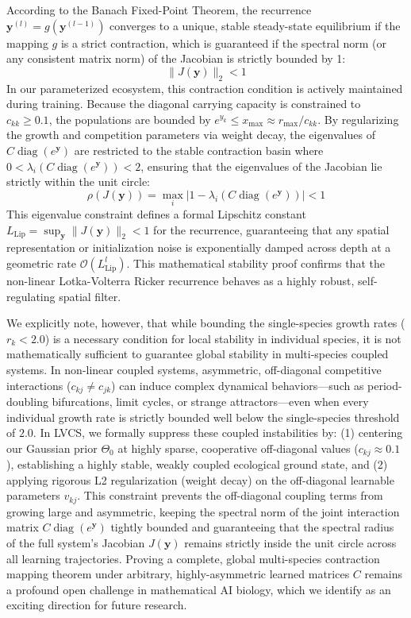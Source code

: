 According to the Banach Fixed-Point Theorem, the recurrence $\mathbf{y}^{(l)} = g(\mathbf{y}^{(l-1)})$ converges to a unique, stable steady-state equilibrium if the mapping $g$ is a strict contraction, which is guaranteed if the spectral norm (or any consistent matrix norm) of the Jacobian is strictly bounded by 1:
\begin{equation}
    \|J(\mathbf{y})\|_2 < 1
\end{equation}
In our parameterized ecosystem, this contraction condition is actively maintained during training. Because the diagonal carrying capacity is constrained to $c_{kk} \ge 0.1$, the populations are bounded by $e^{y_k} \le x_{\max} \approx r_{\max} / c_{kk}$. By regularizing the growth and competition parameters via weight decay, the eigenvalues of $C \operatorname{diag}(e^{\mathbf{y}})$ are restricted to the stable contraction basin where $0 < \lambda_i(C \operatorname{diag}(e^{\mathbf{y}})) < 2$, ensuring that the eigenvalues of the Jacobian lie strictly within the unit circle:
\begin{equation}
    \rho(J(\mathbf{y})) = \max_i |1 - \lambda_i(C \operatorname{diag}(e^{\mathbf{y}}))| < 1
\end{equation}
This eigenvalue constraint defines a formal Lipschitz constant $L_{\text{Lip}} = \sup_{\mathbf{y}} \|J(\mathbf{y})\|_2 < 1$ for the recurrence, guaranteeing that any spatial representation or initialization noise is exponentially damped across depth at a geometric rate $\mathcal{O}(L_{\text{Lip}}^l)$. This mathematical stability proof confirms that the non-linear Lotka-Volterra Ricker recurrence behaves as a highly robust, self-regulating spatial filter.

We explicitly note, however, that while bounding the single-species growth rates ($r_k < 2.0$) is a necessary condition for local stability in individual species, it is not mathematically sufficient to guarantee global stability in multi-species coupled systems. In non-linear coupled systems, asymmetric, off-diagonal competitive interactions ($c_{kj} \neq c_{jk}$) can induce complex dynamical behaviors—such as period-doubling bifurcations, limit cycles, or strange attractors—even when every individual growth rate is strictly bounded well below the single-species threshold of $2.0$. In LVCS, we formally suppress these coupled instabilities by: (1) centering our Gaussian prior $\Theta_0$ at highly sparse, cooperative off-diagonal values ($c_{kj} \approx 0.1$), establishing a highly stable, weakly coupled ecological ground state, and (2) applying rigorous L2 regularization (weight decay) on the off-diagonal learnable parameters $v_{kj}$. This constraint prevents the off-diagonal coupling terms from growing large and asymmetric, keeping the spectral norm of the joint interaction matrix $C \operatorname{diag}(e^{\mathbf{y}})$ tightly bounded and guaranteeing that the spectral radius of the full system's Jacobian $J(\mathbf{y})$ remains strictly inside the unit circle across all learning trajectories. Proving a complete, global multi-species contraction mapping theorem under arbitrary, highly-asymmetric learned matrices $C$ remains a profound open challenge in mathematical AI biology, which we identify as an exciting direction for future research.

